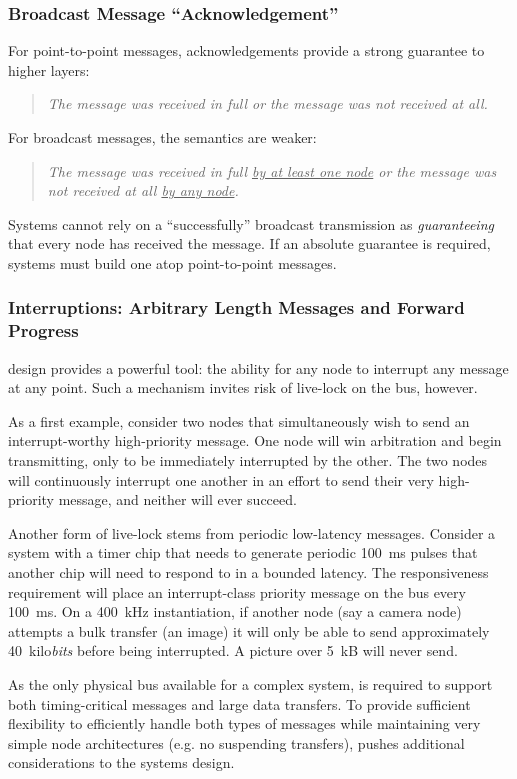\subsubsection{Broadcast Message ``Acknowledgement''}
For point-to-point messages, \bus acknowledgements provide a strong guarantee
to higher layers:
%
\begin{quote}
\textit{The message was received in full or the message was not received at
all.}
\end{quote}
%
For broadcast messages, the \bus semantics are weaker:
%
\begin{quote}
\textit{The message was received in full \uline{by at least one node} or the
message was not received at all \uline{by any node}.}
\end{quote}
%
Systems cannot rely on a ``successfully''
broadcast transmission as {\em guaranteeing} that every node has received the
message.  If an absolute guarantee is required, systems must build one atop
point-to-point messages.


\subsubsection{Interruptions: Arbitrary Length Messages and Forward Progress}
\bus design provides a powerful tool: the ability for any node to interrupt
any message at any point. Such a mechanism invites risk of live-lock on the
bus, however.

As a first example, consider two nodes that simultaneously wish to send an
interrupt-worthy high-priority message. One node will win arbitration and
begin transmitting, only to be immediately interrupted by the other. The two
nodes will continuously interrupt one another in an effort to send their very
high-priority message, and neither will ever succeed.

Another form of live-lock stems from periodic low-latency messages. Consider a
system with a timer chip that needs to generate periodic 100~ms pulses that
another chip will need to respond to in a bounded latency. The responsiveness
requirement will place an interrupt-class priority message on the bus every
100~ms. On a 400~kHz instantiation, if another node (say a camera node)
attempts a bulk transfer (an image) it will only be able to send approximately
40~kilo{\em bits} before being interrupted. A picture over 5~kB will never
send.

As the only physical bus available for a complex system, \bus is required to
support both timing-critical messages and large data transfers. To provide
sufficient flexibility to efficiently handle both types of messages while
maintaining very simple node architectures (e.g. no suspending transfers),
\bus pushes additional considerations to the systems design.


